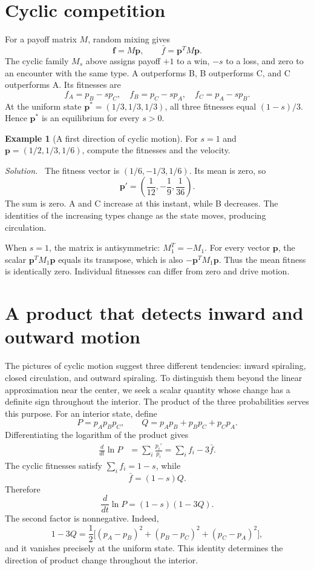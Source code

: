 \documentclass[11pt,oneside,openany]{book}
\theoremstyle{definition}
\newtheorem{example}{Example}[chapter]
\theoremstyle{remark}
\newenvironment{solution}{\par\smallskip\noindent\textit{Solution.}\ }{\par\smallskip}
\newcommand{\p}{\mathbf{p}}
\newcommand{\f}{\mathbf{f}}
\numberwithin{equation}{chapter}
\begin{document}
\section{Cyclic competition}
For a payoff matrix $M$, random mixing gives
\[
\f=M\p,\qquad \bar f=\p^TM\p.
\]
The cyclic family $M_s$ above assigns payoff $+1$ to a win, $-s$ to a loss, and zero to an encounter with the same type. A outperforms B, B outperforms C, and C outperforms A. Its fitnesses are
\begin{equation}\label{eq:cyclicfitness}
f_A=p_B-sp_C,\quad f_B=p_C-sp_A,\quad f_C=p_A-sp_B.
\end{equation}
At the uniform state $\p^*=(1/3,1/3,1/3)$, all three fitnesses equal $(1-s)/3$. Hence $\p^*$ is an equilibrium for every $s>0$.

\begin{example}[A first direction of cyclic motion]
For $s=1$ and $\p=(1/2,1/3,1/6)$, compute the fitnesses and the velocity.
\begin{solution}
The fitness vector is $(1/6,-1/3,1/6)$. Its mean is zero, so
\[
\p'=\left(\frac1{12},-\frac19,\frac1{36}\right).
\]
The sum is zero. A and C increase at this instant, while B decreases. The identities of the increasing types change as the state moves, producing circulation.
\end{solution}
\end{example}

When $s=1$, the matrix is antisymmetric: $M_1^T=-M_1$. For every vector $\p$, the scalar $\p^TM_1\p$ equals its transpose, which is also $-\p^TM_1\p$. Thus the mean fitness is identically zero. Individual fitnesses can differ from zero and drive motion.

\section{A product that detects inward and outward motion}
The pictures of cyclic motion suggest three different tendencies: inward spiraling, closed circulation, and outward spiraling. To distinguish them beyond the linear approximation near the center, we seek a scalar quantity whose change has a definite sign throughout the interior. The product of the three probabilities serves this purpose.
For an interior state, define
\[
P=p_Ap_Bp_C,\qquad Q=p_Ap_B+p_Bp_C+p_Cp_A.
\]
Differentiating the logarithm of the product gives
\begin{align*}
\frac{d}{dt}\ln P
&=\sum_i\frac{p_i'}{p_i}
=\sum_i f_i-3\bar f.
\end{align*}
The cyclic fitnesses satisfy $\sum_i f_i=1-s$, while
\[
\bar f=(1-s)Q.
\]
Therefore
\begin{equation}\label{eq:productderivative}
\boxed{\frac{d}{dt}\ln P=(1-s)(1-3Q).}
\end{equation}
The second factor is nonnegative. Indeed,
\[
1-3Q=\frac12\bigl[(p_A-p_B)^2+(p_B-p_C)^2+(p_C-p_A)^2\bigr],
\]
and it vanishes precisely at the uniform state. This identity determines the direction of product change throughout the interior.
\end{document}
